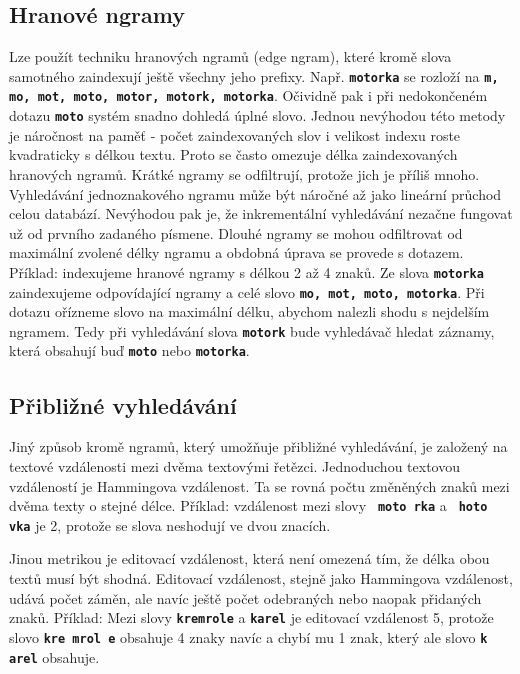\documentclass[11pt,letterpaper,oneside,openright]{book}
\newcommand{\bftt}[1]{\texttt{\textbf{#1}}}
\newcommand{\boldred}[1]{\textbf{\color{red} #1}}
\begin{document}
\subsection{Hranové ngramy} Lze použít techniku hranových ngramů
(edge ngram), které kromě slova samotného zaindexují ještě všechny jeho
prefixy. Např. \bftt{motorka} se rozloží na \bftt{m, mo, mot, moto,
motor, motork, motorka}. Očividně pak i při nedokončeném dotazu
\bftt{moto} systém snadno dohledá úplné slovo. Jednou nevýhodou této
metody je náročnost na paměť - počet zaindexovaných slov i velikost
indexu roste kvadraticky s délkou textu. Proto se často omezuje délka
zaindexovaných hranových ngramů. Krátké ngramy se odfiltrují, protože
jich je příliš mnoho.  Vyhledávání jednoznakového ngramu může být
náročné až jako lineární průchod celou databází. Nevýhodou pak je, že
inkrementální vyhledávání nezačne fungovat už od prvního zadaného
písmene. Dlouhé ngramy se mohou odfiltrovat od maximální zvolené délky
ngramu a obdobná úprava se provede s dotazem. Příklad: indexujeme
hranové ngramy s délkou 2 až 4 znaků. Ze slova \bftt{motorka}
zaindexujeme odpovídající ngramy a celé slovo \bftt{mo, mot, moto,
motorka}. Při dotazu ořízneme slovo na maximální délku, abychom nalezli
shodu s nejdelším ngramem.  Tedy při vyhledávání slova \bftt{motork}
bude vyhledávač hledat záznamy, která obsahují buď \bftt{moto} nebo
\bftt{motorka}.

\subsection{Přibližné vyhledávání}
Jiný způsob kromě ngramů, který umožňuje přibližné vyhledávání, je založený na
textové vzdálenosti mezi dvěma textovými řetězci. Jednoduchou textovou
vzdáleností je Hammingova vzdálenost. Ta se rovná počtu změněných znaků mezi
dvěma texty o stejné délce. Příklad: vzdálenost mezi slovy
\bftt{\boldred{m}oto\boldred{r}ka} a \bftt{\boldred{h}oto\boldred{v}ka} je 2,
protože se slova neshodují ve dvou znacích.

Jinou metrikou je editovací vzdálenost, která není omezená tím, že délka obou
textů musí být shodná. Editovací vzdálenost, stejně jako Hammingova vzdálenost,
udává počet záměn, ale navíc ještě počet odebraných nebo naopak přidaných
znaků. Příklad: Mezi slovy \bftt{kremrole} a \bftt{karel} je editovací
vzdálenost 5, protože slovo \bftt{kre\boldred{mro}l\boldred{e}} obsahuje 4
znaky navíc a chybí mu 1 znak, který ale slovo \bftt{k\boldred{a}rel} obsahuje.
\end{document}
